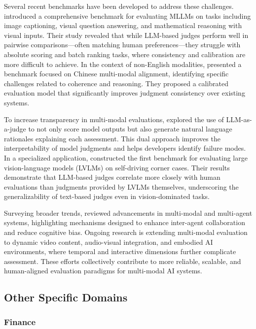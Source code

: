 Several recent benchmarks have been developed to address these challenges. \citet{mllm-as-a-judge} introduced a comprehensive benchmark for evaluating MLLMs on tasks including image captioning, visual question answering, and mathematical reasoning with visual inputs. Their study revealed that while LLM-based judges perform well in pairwise comparisons—often matching human preferences—they struggle with absolute scoring and batch ranking tasks, where consistency and calibration are more difficult to achieve. In the context of non-English modalities, \citet{wu2024alignmmbench} presented a benchmark focused on Chinese multi-modal alignment, identifying specific challenges related to coherence and reasoning. They proposed a calibrated evaluation model that significantly improves judgment consistency over existing systems.

To increase transparency in multi-modal evaluations, \citet{xiong2024llava} explored the use of LLM-as-a-judge to not only score model outputs but also generate natural language rationales explaining each assessment. This dual approach improves the interpretability of model judgments and helps developers identify failure modes. In a specialized application, \citet{chen2024automated} constructed the first benchmark for evaluating large vision-language models (LVLMs) on self-driving corner cases. Their results demonstrate that LLM-based judges correlate more closely with human evaluations than judgments provided by LVLMs themselves, underscoring the generalizability of text-based judges even in vision-dominated tasks.

Surveying broader trends, \citet{jiang2024multi} reviewed advancements in multi-modal and multi-agent systems, highlighting mechanisms designed to enhance inter-agent collaboration and reduce cognitive bias. Ongoing research is extending multi-modal evaluation to dynamic video content, audio-visual integration, and embodied AI environments, where temporal and interactive dimensions further complicate assessment. These efforts collectively contribute to more reliable, scalable, and human-aligned evaluation paradigms for multi-modal AI systems.







\subsection{Other Specific Domains}
\subsubsection{\textbf{Finance}}

